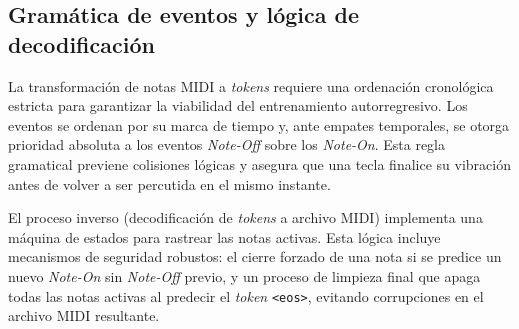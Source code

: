 \subsection{Gramática de eventos y lógica de decodificación}

La transformación de notas MIDI a \textit{tokens} requiere una ordenación
cronológica estricta para garantizar la viabilidad del entrenamiento
autorregresivo. Los eventos se ordenan por su marca de tiempo y, ante
empates temporales, se otorga prioridad absoluta a los eventos
\textit{Note-Off} sobre los \textit{Note-On}. Esta regla gramatical
previene colisiones lógicas y asegura que una tecla finalice su
vibración antes de volver a ser percutida en el mismo instante.

El proceso inverso (decodificación de \textit{tokens} a archivo MIDI)
implementa una máquina de estados para rastrear las notas activas. Esta
lógica incluye mecanismos de seguridad robustos: el cierre forzado de una
nota si se predice un nuevo \textit{Note-On} sin \textit{Note-Off} previo,
y un proceso de limpieza final que apaga todas las notas activas al
predecir el \textit{token} \texttt{<eos>}, evitando corrupciones en el
archivo MIDI resultante.